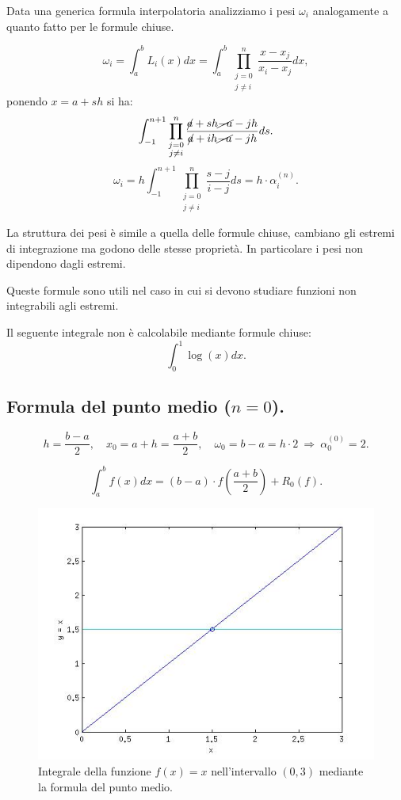 Data una generica formula interpolatoria analizziamo i pesi $\omega_i$ 
analogamente a quanto fatto per le formule chiuse.

\[\omega_i = \int_a^bL_i(x)dx = \int_a^b\prod_{\substack{j = 0 \\ j \neq i}}^n 
\frac{x-x_j}{x_i-x_j}dx,\]
ponendo $x = a+sh$ si ha: 
\[
\int_{-1}^{n+1}\prod_{\substack{j = 0 \\ j \neq i}}^n 
\frac{\cancel{a} +sh \cancel{-a} -jh}{\cancel{a} +ih \cancel{-a} -jh}
ds.\]
\[
\omega_i = h \int_{-1}^{n+1}\prod_{\substack{j = 0 \\ j \neq i}}^n \frac{s-j}{i-j}ds
= h \cdot \alpha_i^{(n)}.
\]

La struttura dei pesi è simile a quella delle formule chiuse, cambiano gli
estremi di integrazione ma godono delle stesse proprietà. In particolare
i pesi non dipendono dagli estremi.

Queste formule sono utili nel caso in cui si devono studiare funzioni non
integrabili agli estremi.
\begin{exe}Il seguente integrale non è calcolabile mediante formule chiuse:
\[\int_0^1\log(x)dx.\]
\end{exe}

\subsection{Formula del punto medio ($n=0$).}
\[
h = \frac{b-a}{2}, \quad x_0 = a+h = \frac{a+b}{2}, \quad \omega_0 = b-a
= h\cdot 2\ \Rightarrow\ \alpha_0^{(0)} = 2.
\]

\[
\int_a^bf(x)dx = (b-a)\cdot f\left(\frac{a+b}{2}\right) + R_0(f).
\]

\begin{figure}[ht!]\begin{center}
\includegraphics[scale=0.50]{fig/punto_medio.jpg}\end{center}
\caption{Integrale della funzione $f(x) = x$ nell'intervallo $(0,3)$ mediante
la formula del punto medio.}
\label{fig_puntomedio}\end{figure}

